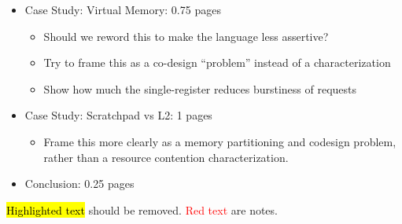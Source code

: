\begin{itemize}
    \item Case Study: Virtual Memory: 0.75 pages
        \begin{itemize}
            \item Should we reword this to make the language less assertive?
            \item Try to frame this as a co-design ``problem'' instead of a characterization
            \item Show how much the single-register reduces burstiness of requests
        \end{itemize}
    \item Case Study: Scratchpad vs L2: 1 pages
        \begin{itemize}
            \item Frame this more clearly as a memory partitioning and codesign problem, rather than a resource contention characterization.
        \end{itemize}
    \item Conclusion: 0.25 pages
\end{itemize}

\hl{Highlighted text} should be removed. \textcolor{red}{Red text} are notes.
\newpage

